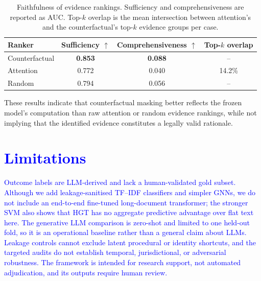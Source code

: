 \documentclass[runningheads]{llncs}
\begin{document}
\begin{table}[t]
\centering
\small
\setlength{\tabcolsep}{4pt}
\caption{Faithfulness of evidence rankings. Sufficiency and
comprehensiveness are reported as AUC. Top-$k$ overlap is the mean
intersection between attention's and the counterfactual's top-$k$
evidence groups per case.}
\label{tab:faithfulness}
\begin{tabular}{lccc}
\hline
Ranker & Sufficiency $\uparrow$ &
Comprehensiveness $\uparrow$ & Top-$k$ overlap \\
\hline
Counterfactual & \textbf{0.853} & \textbf{0.088} & -- \\
Attention      & 0.772          & 0.040          & 14.2\% \\
Random         & 0.794          & 0.056          & -- \\
\hline
\end{tabular}
\end{table}
These results indicate that counterfactual masking better reflects the frozen
model's computation than raw attention or random evidence rankings, while not
implying that the identified evidence constitutes a legally valid rationale.


\section{\textcolor{blue}{Limitations}}
\textcolor{blue}{Outcome labels are LLM-derived and lack a human-validated gold subset. Although we add leakage-sanitised TF--IDF classifiers and simpler GNNs, we do not include an end-to-end fine-tuned long-document transformer; the stronger SVM also shows that HGT has no aggregate predictive advantage over flat text here. The generative LLM comparison is zero-shot and limited to one held-out fold, so it is an operational baseline rather than a general claim about LLMs. Leakage controls cannot exclude latent procedural or identity shortcuts, and
the targeted audits do not establish temporal, jurisdictional, or adversarial
robustness. The framework is
intended for research support, not automated adjudication, and its outputs
require human review.}
\end{document}
